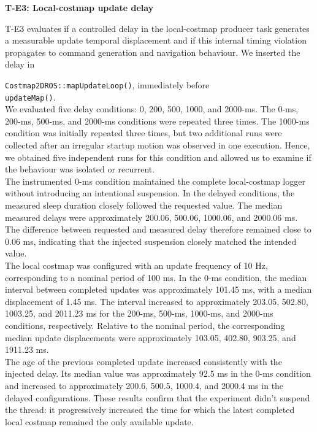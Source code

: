 \noindent \textbf{T-E3: Local-costmap update delay}

\noindent T-E3 evaluates if a controlled delay in the local-costmap producer task generates a measurable update temporal displacement and if this internal timing violation propagates to command generation and navigation behaviour. We inserted the delay in 

\noindent \texttt{Costmap2DROS::mapUpdateLoop()}, immediately before 
\\
\texttt{updateMap()}.
\\
We evaluated five delay conditions: 0, 200, 500, 1000, and 2000-ms. The 0-ms, 200-ms, 500-ms, and 2000-ms conditions were repeated three times. The 1000-ms condition was initially repeated three times, but two additional runs were collected after an irregular startup motion was observed in one execution. Hence, we obtained five independent runs for this condition and allowed us to examine if the behaviour was isolated or recurrent.
\\
The instrumented 0-ms condition maintained the complete local-costmap logger without introducing an intentional suspension. In the delayed conditions, the measured sleep duration closely followed the requested value. The median measured delays were approximately 200.06, 500.06, 1000.06, and 2000.06 ms. The difference between requested and measured delay therefore remained close to 0.06 ms, indicating that the injected suspension closely matched the intended value.
\\
The local costmap was configured with an update frequency of 10 Hz, corresponding to a nominal period of 100 ms. In the 0-ms condition, the median interval between completed updates was approximately 101.45 ms, with a median displacement of 1.45 ms. The interval increased to approximately 203.05, 502.80, 1003.25, and 2011.23 ms for the 200-ms, 500-ms, 1000-ms, and 2000-ms conditions, respectively. Relative to the nominal period, the corresponding median update displacements were approximately 103.05, 402.80, 903.25, and 1911.23 ms.
\\
The age of the previous completed update increased consistently with the injected delay. Its median value was approximately 92.5 ms in the 0-ms condition and increased to approximately 200.6, 500.5, 1000.4, and 2000.4 ms in the delayed configurations. These results confirm that the experiment didn't suspend the thread: it progressively increased the time for which the latest completed local costmap remained the only available update.
\\
